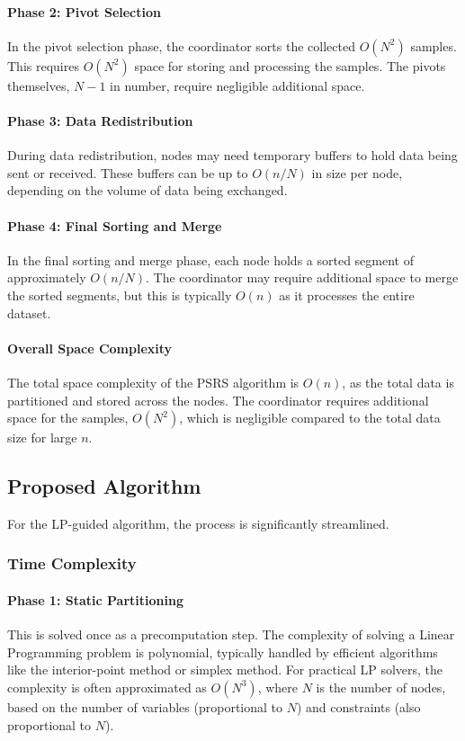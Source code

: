 \documentclass[]{interact}
\theoremstyle{plain}
\theoremstyle{definition}
\theoremstyle{remark}
\begin{document}
\paragraph{Phase 2: Pivot Selection} 
In the pivot selection phase, the coordinator sorts the collected $O(N^2)$ samples. This requires $O(N^2)$ space for storing and processing the samples. The pivots themselves, $N - 1$ in number, require negligible additional space.

\paragraph{Phase 3: Data Redistribution} 
During data redistribution, nodes may need temporary buffers to hold data being sent or received. These buffers can be up to $O(n/N)$ in size per node, depending on the volume of data being exchanged.

\paragraph{Phase 4: Final Sorting and Merge} 
In the final sorting and merge phase, each node holds a sorted segment of approximately $O(n/N)$. The coordinator may require additional space to merge the sorted segments, but this is typically $O(n)$ as it processes the entire dataset.

\paragraph{Overall Space Complexity} 
The total space complexity of the PSRS algorithm is $O(n)$, as the total data is partitioned and stored across the nodes. The coordinator requires additional space for the samples, $O(N^2)$, which is negligible compared to the total data size for large $n$.

\subsection{Proposed Algorithm}
For the LP-guided algorithm, the process is significantly streamlined.

\subsubsection{Time Complexity}

\paragraph{Phase 1: Static Partitioning}
This is solved once as a precomputation step. The complexity of solving a Linear Programming problem is polynomial, typically handled by efficient algorithms like the interior-point method or simplex method. For practical LP solvers, the complexity is often approximated as $O(N^3)$, where $N$ is the number of nodes, based on the number of variables (proportional to $N$) and constraints (also proportional to $N$). 
\end{document}
